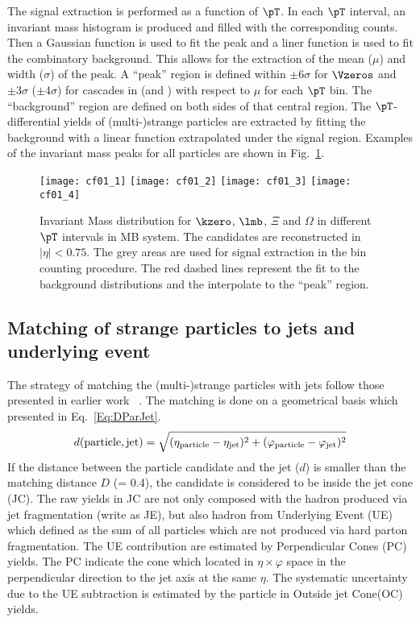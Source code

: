 The signal extraction is performed as a function of $\pT$.
In each $\pT$ interval, an invariant mass histogram is produced and filled with the corresponding counts.
Then a Gaussian function is used to fit the peak and a liner function is used to fit the combinatory background.
This allows for the extraction of the mean ($\mu$) and width ($\sigma$) of the peak.
A ``peak'' region is defined within $\pm 6\sigma$ for $\Vzeros$ and $\pm 3\sigma$ ($\pm 4\sigma$) for cascades in \pp (and \pPb) with respect to $\mu$ for each $\pT$ bin.
The ``background'' region are defined on both sides of that central region.
The $\pT$-differential yields of (multi-)strange particles are extracted by fitting the background with a linear function extrapolated under the signal region.
Examples of the invariant mass peaks for all particles are shown in Fig.~\ref{fig:InvM}.
\begin{figure}[!ht]
\begin{center}
\texttt{[image: cf01\_1]}
\texttt{[image: cf01\_2]}
\texttt{[image: cf01\_3]}
\texttt{[image: cf01\_4]}
\caption{Invariant Mass distribution for $\kzero$, $\lmb$, $\Xi$ and $\Omega$ in different $\pT$ intervals in MB \pPb system. The candidates are reconstructed in $|\eta|<0.75$.
The grey areas are used for signal extraction in the bin counting procedure.
The red dashed lines represent the fit to the background distributions and the interpolate to the ``peak'' region.}
\label{fig:InvM}
\end{center}
\end{figure}

\subsection{Matching of strange particles to jets and underlying event}%
\label{sec:ParJetMatch}

The strategy of matching the (multi-)strange particles with jets follow those presented in earlier work~\cite{V0injet} .
The matching is done on a geometrical basis which presented in Eq.~\ref{Eq:DParJet}.
\begin{equation}
	d(\mathrm{particle, jet}) = \sqrt{(\eta_\mathrm{particle} -\eta_{\rm jet})^{2} + (\varphi_\mathrm{particle} -\varphi_{\rm jet})^{2}}
	\label{eq:DParJet}
\end{equation}
If the distance between the particle candidate and the jet ($d$) is smaller than the matching distance $D$ (= 0.4), the candidate is considered to be inside the jet cone (JC).
The raw yields in JC are not only composed with the hadron produced via jet fragmentation (write as JE), but also hadron from Underlying Event (UE) which defined as the sum of all particles which are not produced via hard parton fragmentation.
The UE contribution are estimated by Perpendicular Cones (PC) yields.
The PC indicate the cone which located in $\eta \times \varphi$ space in the perpendicular direction to the jet axis at the same $\eta$.
The systematic uncertainty due to the UE subtraction is estimated by the particle in Outside jet Cone(OC) yields. 

